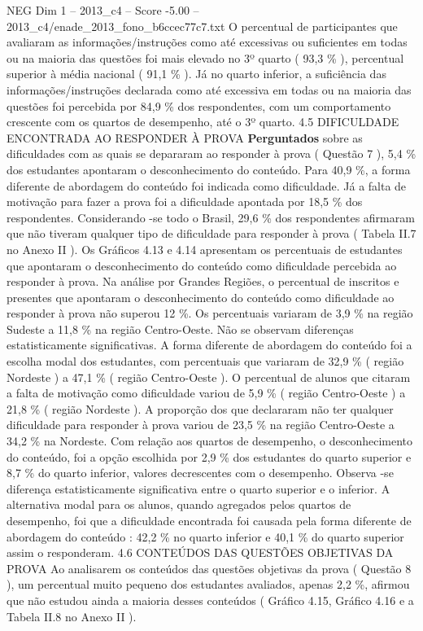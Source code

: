 \begin{textsample}{NEG Dim 1 – 2013\_c4 – Score -5.00 – 2013\_c4/enade\_2013\_fono\_b6ccec77c7.txt}
O percentual de participantes que avaliaram as informações/instruções como até excessivas ou suficientes em todas ou na maioria das questões foi mais elevado no 3º quarto ( 93,3 \% ), percentual superior à média nacional ( 91,1 \% ).
Já no quarto inferior, a suficiência das informações/instruções declarada como até excessiva em todas ou na maioria das questões foi percebida por 84,9 \% dos respondentes, com um comportamento crescente com os quartos de desempenho, até o 3º quarto. 4.5 DIFICULDADE ENCONTRADA AO RESPONDER À PROVA \textbf{Perguntados} sobre as dificuldades com as quais se depararam ao responder à prova ( Questão 7 ), 5,4 \% dos estudantes apontaram o desconhecimento do conteúdo.
Para 40,9 \%, a forma diferente de abordagem do conteúdo foi indicada como dificuldade.
Já a falta de motivação para fazer a prova foi a dificuldade apontada por 18,5 \% dos respondentes.
Considerando -se todo o Brasil, 29,6 \% dos respondentes afirmaram que não tiveram qualquer tipo de dificuldade para responder à prova ( Tabela II.7 no Anexo II ).
Os Gráficos 4.13 e 4.14 apresentam os percentuais de estudantes que apontaram o desconhecimento do conteúdo como dificuldade percebida ao responder à prova.
Na análise por Grandes Regiões, o percentual de inscritos e presentes que apontaram o desconhecimento do conteúdo como dificuldade ao responder à prova não superou 12 \%.
Os percentuais variaram de 3,9 \% na região Sudeste a 11,8 \% na região Centro-Oeste.
Não se observam diferenças estatisticamente significativas.
A forma diferente de abordagem do conteúdo foi a escolha modal dos estudantes, com percentuais que variaram de 32,9 \% ( região Nordeste ) a 47,1 \% ( região Centro-Oeste ).
O percentual de alunos que citaram a falta de motivação como dificuldade variou de 5,9 \% ( região Centro-Oeste ) a 21,8 \% ( região Nordeste ).
A proporção dos que declararam não ter qualquer dificuldade para responder à prova variou de 23,5 \% na região Centro-Oeste a 34,2 \% na Nordeste.
Com relação aos quartos de desempenho, o desconhecimento do conteúdo, foi a opção escolhida por 2,9 \% dos estudantes do quarto superior e 8,7 \% do quarto inferior, valores decrescentes com o desempenho.
Observa -se diferença estatisticamente significativa entre o quarto superior e o inferior.
A alternativa modal para os alunos, quando agregados pelos quartos de desempenho, foi que a dificuldade encontrada foi causada pela forma diferente de abordagem do conteúdo : 42,2 \% no quarto inferior e 40,1 \% do quarto superior assim o responderam. 4.6 CONTEÚDOS DAS QUESTÕES OBJETIVAS DA PROVA Ao analisarem os conteúdos das questões objetivas da prova ( Questão 8 ), um percentual muito pequeno dos estudantes avaliados, apenas 2,2 \%, afirmou que não estudou ainda a maioria desses conteúdos ( Gráfico 4.15, Gráfico 4.16 e a Tabela II.8 no Anexo II ).

\end{textsample}
